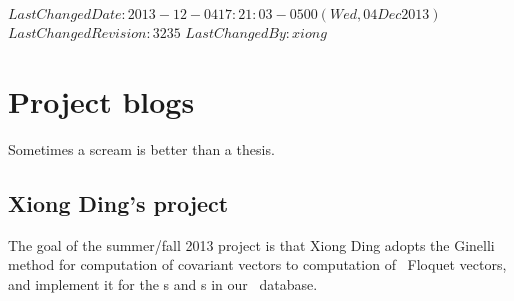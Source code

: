 \ifsvnmulti
 {$LastChangedDate: 2013-12-04 17:21:03 -0500 (Wed, 04 Dec 2013) $}
 {$LastChangedRevision: 3235 $} {$LastChangedBy: xiong $}
\fi

\chapter{Project blogs}
\label{c-students}

\begin{bartlett}{
Sometimes a scream is better than a thesis.
                }
\end{bartlett}


\section{Xiong Ding's project}
\label{sect:introXD}

The goal of the summer/fall 2013 project is that Xiong Ding adopts the Ginelli
\etal{} method for computation of covariant vectors to
computation of \po\ Floquet vectors,  and implement it for the \po s and
\rpo s in our \KS\ database.


